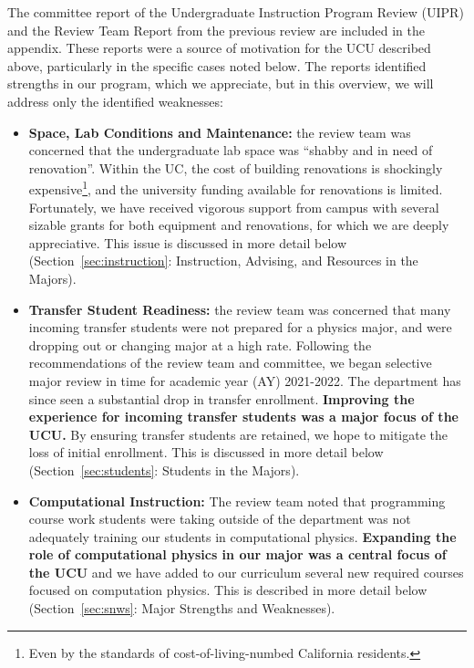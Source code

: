 \documentclass[12pt]{article}
\begin{document}
\noindent
The committee report of the Undergraduate Instruction Program Review
(UIPR) and the Review Team Report from the previous review are
included in the appendix.  These reports were a source of motivation
for the UCU described above, particularly in the specific cases noted
below.  The reports identified strengths in our program, which we
appreciate, but in this overview, we will address only the identified
weaknesses:
\begin{itemize}
 \item {\bf Space, Lab Conditions and Maintenance:} the review team
   was concerned that the undergraduate lab space was ``shabby and in
   need of renovation''.  Within the UC, the cost of building
   renovations is shockingly expensive\footnote{Even by the standards
     of cost-of-living-numbed California residents.}, and the
   university funding available for renovations is limited.
   Fortunately, we have received vigorous support from campus with
   several sizable grants for both equipment and renovations, for
   which we are deeply appreciative.  This issue is discussed in more
   detail below (Section~\ref{sec:instruction}: Instruction, Advising, and Resources in the Majors).
  
 \item {\bf Transfer Student Readiness:} the review team was concerned
   that many incoming transfer students were not prepared for a
   physics major, and were dropping out or changing major at a high
   rate.  Following the recommendations of the review team and
   committee, we began selective major review in time for academic
   year (AY) 2021-2022.  The department has since seen a substantial
   drop in transfer enrollment. {\bf Improving the experience for
     incoming transfer students was a major focus of the UCU.}  By
   ensuring transfer students are retained, we hope to mitigate the
   loss of initial enrollment.  This is discussed in more detail below
   (Section~\ref{sec:students}: Students in the Majors).

   
 \item {\bf Computational Instruction:} The review team noted that
   programming course work students were taking outside of the
   department was not adequately training our students in
   computational physics.  {\bf Expanding the role of computational
     physics in our major was a central focus of the UCU} and we have
   added to our curriculum several new required courses focused on
   computation physics.  This is described in more detail below
   (Section~\ref{sec:snws}: Major Strengths and Weaknesses).
  

\end{itemize}
\end{document}
